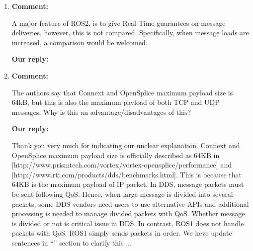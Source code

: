 \documentclass{article}
\begin{document}
\begin{enumerate}
  \begin{flushleft}
    \textbf{Our reply:}
  \end{flushleft}
  Thank you for pointing out our lack of explanation.
  In best-effort policy, ``none'' means there is no inital loss when a subscriber-node is launched before a publisher-node begins to send messages.
  As you explained, a node with best-effort policy does not have backlog and there will be a lot of messag loss for lata-joining nodes.
  In Table 3, ``Inital loss'' means whether there is message loss or not for pre-joining nodes.
  ``Inital loss'' in not for late-joining nodes.
  After receiving your comment, we have modified sentences in the beginning of ``Capabilities of ROS1 and ROS2'' section to make it easy to understand.
  \begin{itembox}[|]{Added a sentence in ``Capabilities of ROS1 and ROS2'' section}
    In \texttt{best-effort policy}, a \texttt{subscriber-node} must be launched before a \emph{publisher-node} begins to send \emph{messages} for ``Initial loss'' none.
  \end{itembox}\\

\item \begin{flushleft}
    \textbf{Comment:}
  \end{flushleft}
  A major feature of ROS2, is to give Real Time guarantees on message deliveries, however, this is not compared. Specifically, when message loads are increased, a comparison would be welcomed.

  \begin{flushleft}
    \textbf{Our reply:}
  \end{flushleft}

\item \begin{flushleft}
    \textbf{Comment:}
  \end{flushleft}
  The authors say that Connext and OpenSplice maximum payload size is 64kB, but this is also the maximum payload of both TCP and UDP messages. Why is this an advantage/disadvantages of this?

  \begin{flushleft}
    \textbf{Our reply:}
  \end{flushleft}
  Thank you very much for indicating our unclear explanation.
  Connext and OpenSplice maximum payload size is officially described as 64KB in [http://www.prismtech.com/vortex/vortex-opensplice/performance] and [http://www.rti.com/products/dds/benchmarks.html].
  This is because that 64KB is the maximum payload of IP packet.
  In DDS, message packets must be sent following QoS.
  Hence, when large message is divided into several packets, some DDS vendors need users to use alternative APIs and additional processing is needed to manage divided packets with QoS.
  Whether message is divided or not is critical issue in DDS.
  In contrast, ROS1 does not handle packets with QoS.
  ROS1 simply sends packets in order.
  We heve update sentences in ``'' section to clarify this ...


\end{enumerate}
\end{document}

